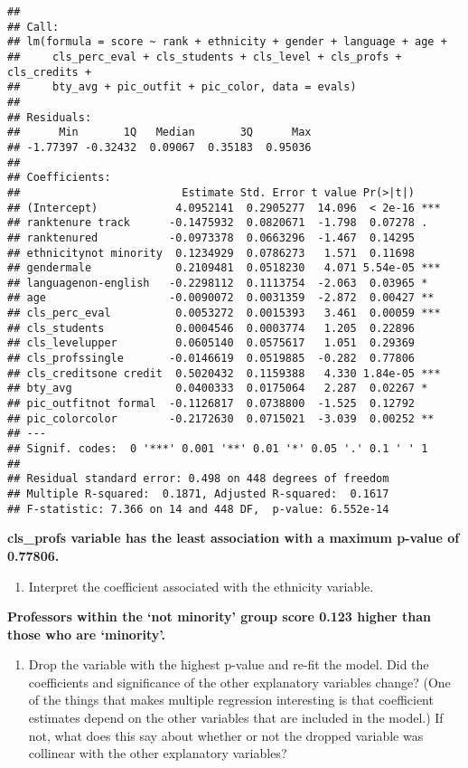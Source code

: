 \documentclass[
]{article}
\providecommand{\tightlist}{%
  \setlength{\itemsep}{0pt}\setlength{\parskip}{0pt}}
\begin{document}
\begin{verbatim}
## 
## Call:
## lm(formula = score ~ rank + ethnicity + gender + language + age + 
##     cls_perc_eval + cls_students + cls_level + cls_profs + cls_credits + 
##     bty_avg + pic_outfit + pic_color, data = evals)
## 
## Residuals:
##      Min       1Q   Median       3Q      Max 
## -1.77397 -0.32432  0.09067  0.35183  0.95036 
## 
## Coefficients:
##                         Estimate Std. Error t value Pr(>|t|)    
## (Intercept)            4.0952141  0.2905277  14.096  < 2e-16 ***
## ranktenure track      -0.1475932  0.0820671  -1.798  0.07278 .  
## ranktenured           -0.0973378  0.0663296  -1.467  0.14295    
## ethnicitynot minority  0.1234929  0.0786273   1.571  0.11698    
## gendermale             0.2109481  0.0518230   4.071 5.54e-05 ***
## languagenon-english   -0.2298112  0.1113754  -2.063  0.03965 *  
## age                   -0.0090072  0.0031359  -2.872  0.00427 ** 
## cls_perc_eval          0.0053272  0.0015393   3.461  0.00059 ***
## cls_students           0.0004546  0.0003774   1.205  0.22896    
## cls_levelupper         0.0605140  0.0575617   1.051  0.29369    
## cls_profssingle       -0.0146619  0.0519885  -0.282  0.77806    
## cls_creditsone credit  0.5020432  0.1159388   4.330 1.84e-05 ***
## bty_avg                0.0400333  0.0175064   2.287  0.02267 *  
## pic_outfitnot formal  -0.1126817  0.0738800  -1.525  0.12792    
## pic_colorcolor        -0.2172630  0.0715021  -3.039  0.00252 ** 
## ---
## Signif. codes:  0 '***' 0.001 '**' 0.01 '*' 0.05 '.' 0.1 ' ' 1
## 
## Residual standard error: 0.498 on 448 degrees of freedom
## Multiple R-squared:  0.1871, Adjusted R-squared:  0.1617 
## F-statistic: 7.366 on 14 and 448 DF,  p-value: 6.552e-14
\end{verbatim}

\textbf{cls\_profs variable has the least association with a maximum
p-value of 0.77806.}

\begin{enumerate}
\def\labelenumi{\arabic{enumi}.}
\setcounter{enumi}{12}
\tightlist
\item
  Interpret the coefficient associated with the ethnicity variable.
\end{enumerate}

\textbf{Professors within the `not minority' group score 0.123 higher
than those who are `minority'.}

\begin{enumerate}
\def\labelenumi{\arabic{enumi}.}
\setcounter{enumi}{13}
\tightlist
\item
  Drop the variable with the highest p-value and re-fit the model. Did
  the coefficients and significance of the other explanatory variables
  change? (One of the things that makes multiple regression interesting
  is that coefficient estimates depend on the other variables that are
  included in the model.) If not, what does this say about whether or
  not the dropped variable was collinear with the other explanatory
  variables?
\end{enumerate}
\end{document}
